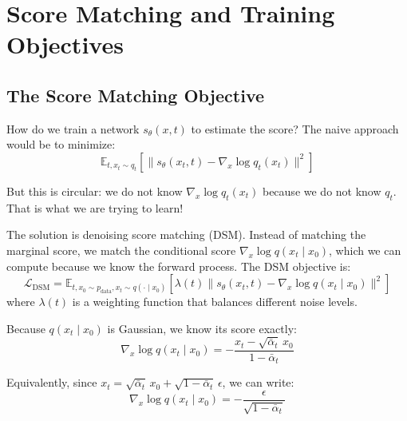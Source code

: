 \vspChapter

\section{Score Matching and Training Objectives}
\label{sec:score_matching}

\vspBlock

\subsection{The Score Matching Objective}

How do we train a network $s_\theta(x,t)$ to estimate the score? The naive approach would be to minimize:
%
\begin{equation}
\mathbb{E}_{t, x_t \sim q_t} \left[ \| s_\theta(x_t, t) - \nabla_x \log q_t(x_t) \|^2 \right]
\end{equation}

\vspPara

But this is circular: we do not know $\nabla_x \log q_t(x_t)$ because we do not know $q_t$. That is what we are trying to learn!

\vspPara

The solution is denoising score matching (DSM). Instead of matching the marginal score, we match the conditional score $\nabla_x \log q(x_t \mid x_0)$, which we can compute because we know the forward process. The DSM objective is:
%
\begin{equation}
\mathcal{L}_{\text{DSM}} = \mathbb{E}_{t, x_0 \sim p_{\text{data}}, x_t \sim q(\cdot \mid x_0)} \left[ \lambda(t) \| s_\theta(x_t, t) - \nabla_x \log q(x_t \mid x_0) \|^2 \right]
\end{equation}
%
where $\lambda(t)$ is a weighting function that balances different noise levels.

\vspPara

Because $q(x_t \mid x_0)$ is Gaussian, we know its score exactly:
%
\begin{equation}
\nabla_x \log q(x_t \mid x_0) = -\frac{x_t - \sqrt{\bar{\alpha}_t} \, x_0}{1 - \bar{\alpha}_t}
\end{equation}

\vspPara

Equivalently, since $x_t = \sqrt{\bar{\alpha}_t} \, x_0 + \sqrt{1 - \bar{\alpha}_t} \, \epsilon$, we can write:
%
\begin{equation}
\nabla_x \log q(x_t \mid x_0) = -\frac{\epsilon}{\sqrt{1 - \bar{\alpha}_t}}
\end{equation}

